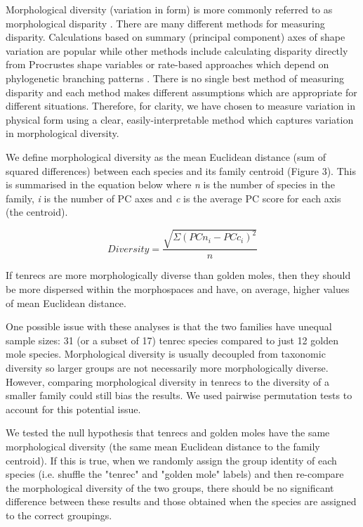 \documentclass[12pt,a4paper]{article}
\begin{document}
	Morphological diversity (variation in form) is more commonly referred to as morphological disparity \citep{Foote1997}. There are many different methods for measuring disparity. Calculations based on summary (principal component) axes of shape variation are popular \citep[e.g.][]{Ruta2013, Foth2012, Brusatte2008, Wainwright2007} while other methods include calculating disparity directly from Procrustes shape variables \citep{Zelditch2012} or rate-based approaches which depend on phylogenetic branching patterns \citep[e.g.][]{Price2013, Price2010, OMeara2006}. There is no single best method of measuring disparity \citep{Ciampaglio2001} and each method makes different assumptions which are appropriate for different situations. Therefore, for clarity, we have chosen to measure variation in physical form using a clear, easily-interpretable method which captures variation in morphological diversity. 	
	
	We define morphological diversity as the mean Euclidean distance (sum of squared differences) between each species and its family centroid (Figure 3). This is summarised in the equation below where \textit{n} is the number of species in the family, \textit{i} is the number of PC axes and \textit{c} is the average PC score for each axis (the centroid). 
	
	\begin{equation}
		Diversity = \frac{\sqrt{\Sigma(PCn_{i}-PCc_{i})^2}}{n}
	\end{equation}

	If tenrecs are more morphologically diverse than golden moles, then they should be more dispersed within the morphospaces and have, on average, higher values of mean Euclidean distance. 	

	One possible issue with these analyses is that the two families have unequal sample sizes: 31 (or a subset of 17) tenrec species compared to just 12 golden mole species. Morphological diversity is usually decoupled from taxonomic diversity \citep[e.g.][]{Ruta2013, Hopkins2013} so larger groups are not necessarily more morphologically diverse. However, comparing morphological diversity in tenrecs to the diversity of a smaller family could still bias the results. We used pairwise permutation tests to account for this potential issue. 

	We tested the null hypothesis that tenrecs and golden moles have the same morphological diversity (the same mean Euclidean distance to the family centroid). If this is true, when we randomly assign the group identity of each species (i.e. shuffle the "tenrec" and "golden mole" labels) and then re-compare the morphological diversity of the two groups, there should be no significant difference between these results and those obtained when the species are assigned to the correct groupings. 
	
\end{document}
